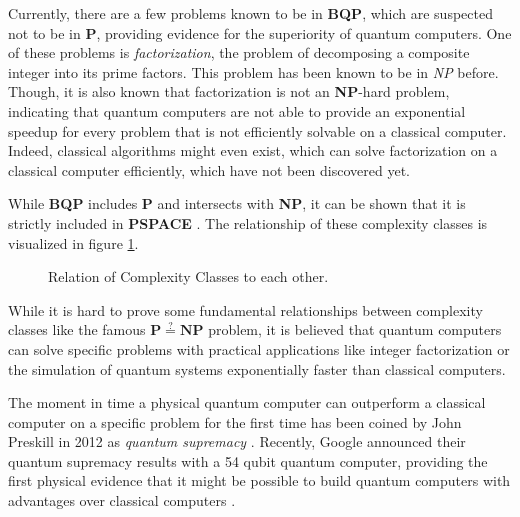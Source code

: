 Currently, there are a few problems known to be in \textbf{BQP}, which are suspected not to be in \textbf{P}, providing evidence for the superiority of quantum computers. One
of these problems is \textit{factorization}, the problem of decomposing a
composite integer into its prime factors. This problem has been known to be in
\textit{NP} before. Though, it is also known that factorization is not an \textbf{NP}-hard problem, indicating that quantum computers are not able to provide
an exponential speedup for every problem that is not efficiently solvable on a
classical computer. Indeed, classical algorithms might even exist, which can
solve factorization on a classical computer efficiently, which have not been
discovered yet.

While \textbf{BQP} includes \textbf{P} and intersects with \textbf{NP}, it can be shown that it is strictly
included in \textbf{PSPACE} \cite{Bernstein93quantumcomplexity}. The relationship of these complexity classes is visualized
in figure \ref{fig:complexityclasses}.

\begin{figure}[H]
  \centering
  \caption[Relation of Complexity Classes to each other]{Relation of Complexity Classes to each other.}
  \label{fig:complexityclasses}
\end{figure}

While it is hard to prove some fundamental relationships between complexity
classes like the famous $\mathbf{P} \stackrel{?}{=} \mathbf{NP}$ problem, it is believed that quantum computers
can solve specific problems with practical applications like integer factorization \cite{shor1997factorisation} or the simulation of
quantum systems \cite{feynman1982simulating} exponentially faster than classical computers.

The moment
in time a physical quantum computer can outperform a classical computer
on a specific problem for the first time has been coined by John Preskill in
2012 as \textit{quantum supremacy} \cite{preskill2012quantum}. Recently, Google announced their quantum
supremacy results with a 54 qubit quantum computer, providing the first physical evidence that it
might be possible to build quantum computers with advantages over classical
computers \cite{martines2019supremacy}.